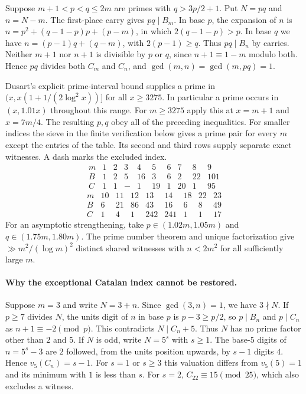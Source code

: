 \documentclass[11pt,a4paper]{article}
\numberwithin{equation}{section}
\begin{document}
Suppose $m+1<p<q\le2m$ are primes with $q>3p/2+1$.
Put $N=pq$ and $n=N-m$. The first-place carry gives $pq\mid B_m$.
In base $p$, the expansion of $n$ is
$n=p^2+(q-1-p)p+(p-m)$, in which $2(q-1-p)>p$.
In base $q$ we have $n=(p-1)q+(q-m)$, with $2(p-1)\ge q$.
Thus $pq\mid B_n$ by carries. Neither $m+1$ nor $n+1$ is divisible
by $p$ or $q$, since $n+1\equiv1-m$ modulo both. Hence $pq$ divides
both $C_m$ and $C_n$, and $\gcd(m,n)=\gcd(m,pq)=1$.

Dusart's explicit prime-interval bound \cite[Theorem~9]{Dusart1998}
supplies a prime in
$(x,x(1+1/(2\log^2 x))]$ for all $x\ge3275$. In particular a
prime occurs in $(x,1.01x)$ throughout this range. For $m\ge3275$
apply this at $x=m+1$ and $x=7m/4$. The resulting $p,q$ obey all of
the preceding inequalities. For smaller indices the sieve in the
finite verification below gives a prime pair for every $m$ except
the entries of the table. Its second and third rows supply separate
exact witnesses. A dash marks the excluded index.
\[
\begin{array}{c|rrrrrrrrr}
 m&1&2&3&4&5&6&7&8&9\\ \hline
 B&1&2&5&16&3&6&2&22&101\\
 C&1&1&-&1&19&1&20&1&95
\end{array}
\]
\[
\begin{array}{c|rrrrrrrr}
 m&10&11&12&13&14&18&22&23\\ \hline
 B&6&21&86&43&16&6&8&49\\
 C&1&4&1&242&241&1&1&17
\end{array}
\]
For an asymptotic strengthening, take $p\in(1.02m,1.05m)$ and
$q\in(1.75m,1.80m)$. The prime number theorem and unique
factorization give $\gg m^2/(\log m)^2$ distinct shared witnesses
with $n<2m^2$ for all sufficiently large $m$.

\paragraph{Why the exceptional Catalan index cannot be restored.}
Suppose $m=3$ and write $N=3+n$. Since $\gcd(3,n)=1$, we have
$3\nmid N$. If $p\ge7$ divides $N$, the units digit of $n$ in
base $p$ is $p-3\ge p/2$, so $p\mid B_n$ and $p\mid C_n$
as $n+1\equiv-2\pmod p$. This contradicts $N\mid C_n+5$.
Thus $N$ has no prime factor other than $2$ and $5$.
If $N$ is odd, write $N=5^s$ with $s\ge1$. The base-$5$ digits
of $n=5^s-3$ are $2$ followed, from the units position upwards,
by $s-1$ digits $4$. Hence $v_5(C_n)=s-1$. For $s=1$ or $s\ge3$
this valuation differs from $v_5(5)=1$ and its minimum with $1$
is less than $s$. For $s=2$, $C_{22}\equiv15\pmod{25}$, which
also excludes a witness.
\end{document}
